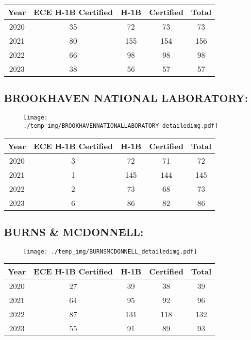 \documentclass{article}%
\begin{document}
%
\begin{longtable}{c|c|c|c|c}%
\hline%
Year&ECE H{-}1B Certified&H{-}1B&Certified&Total\\%
\hline%
2020&35&72&73&73\\%
\hline%
2021&80&155&154&156\\%
\hline%
2022&66&98&98&98\\%
\hline%
2023&38&56&57&57\\%
\hline%
\end{longtable}

%
\newpage%
\subsection{BROOKHAVEN NATIONAL LABORATORY:}%
\label{subsec:BROOKHAVENNATIONALLABORATORY}%
\label{BROOKHAVENNATIONALLABORATORYdetailed}%


\begin{figure}[htbp]%
\centering%
\texttt{[image: ./temp\_img/BROOKHAVENNATIONALLABORATORY\_detailedimg.pdf]}%
\end{figure}

%
\begin{longtable}{c|c|c|c|c}%
\hline%
Year&ECE H{-}1B Certified&H{-}1B&Certified&Total\\%
\hline%
2020&3&72&71&72\\%
\hline%
2021&1&145&144&145\\%
\hline%
2022&2&73&68&73\\%
\hline%
2023&6&86&82&86\\%
\hline%
\end{longtable}

%
\newpage%
\subsection{BURNS \& MCDONNELL:}%
\label{subsec:BURNSMCDONNELL}%
\label{BURNSMCDONNELLdetailed}%


\begin{figure}[htbp]%
\centering%
\texttt{[image: ./temp\_img/BURNSMCDONNELL\_detailedimg.pdf]}%
\end{figure}

%
\begin{longtable}{c|c|c|c|c}%
\hline%
Year&ECE H{-}1B Certified&H{-}1B&Certified&Total\\%
\hline%
2020&27&39&38&39\\%
\hline%
2021&64&95&92&96\\%
\hline%
2022&87&131&118&132\\%
\hline%
2023&55&91&89&93\\%
\hline%
\end{longtable}
\end{document}
